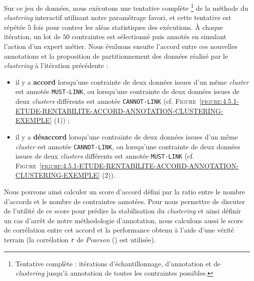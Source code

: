 			Sur ce jeu de données, nous exécutons une tentative complète
			\footnote{Tentative complète : itérations d'échantillonnage, d'annotation et de \textit{clustering} jusqu'à annotation de toutes les contraintes possibles.}
			de la méthode du \textit{clustering} interactif utilisant notre paramétrage favori, et cette tentative est répétée $5$ fois pour contrer les aléas statistiques des exécutions.
			À chaque itération, un lot de $50$ contraintes est sélectionné puis annotés en simulant l'action d'un expert métier.
			Nous évaluons ensuite l'accord entre ces nouvelles annotations et la proposition de partitionnement des données réalisé par le \textit{clustering} à l'itération précédente :
			\begin{itemize}
				\item il y a \textbf{accord} lorsqu'une contrainte de deux données issues d'un même \textit{cluster} est annotée \texttt{MUST-LINK}, ou lorsqu'une contrainte de deux données issues de deux \textit{clusters} différents est annotée \texttt{CANNOT-LINK} (cf. \textsc{Figure~\ref{figure:4.5.1-ETUDE-RENTABILITE-ACCORD-ANNOTATION-CLUSTERING-EXEMPLE} (1)}) ;
				\item il y a \textbf{désaccord} lorsqu'une contrainte de deux données issues d'un même \textit{cluster} est annotée \texttt{CANNOT-LINK}, ou lorsqu'une contrainte de deux données issues de deux \textit{clusters} différents est annotée \texttt{MUST-LINK} (cf. \textsc{Figure~\ref{figure:4.5.1-ETUDE-RENTABILITE-ACCORD-ANNOTATION-CLUSTERING-EXEMPLE} (2)}).
			\end{itemize}
			Nous pouvons ainsi calculer un score d'accord défini par la ratio entre le nombre d'accords et le nombre de contraintes annotées.
			Pour nous permettre de discuter de l'utilité de ce score pour prédire la stabilisation du \textit{clustering} et ainsi définir un cas d'arrêt de notre méthodologie d'annotation, nous calculons aussi le score de corrélation entre cet accord et la performance obtenu à l'aide d'une vérité terrain (la corrélation \texttt{r} de \textit{Pearson} (\cite{kirch:2008:pearson-correlation-coefficient}) est utilisée).


